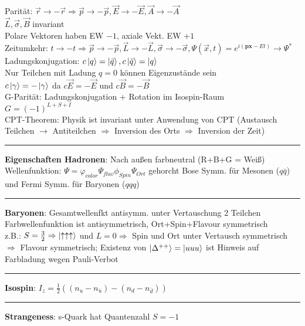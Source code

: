\documentclass[10pt,twoside,a4paper]{article}
\begin{document}
\begin{multicols*}{3}
Parität: $\vec{r} \to - \vec{r} \Rightarrow \vec{p} \to - \vec{p}, \vec{E} \to - \vec{E}, \vec{A} \to - \vec{A}$ \\ $\vec{L}, \vec{\sigma}, \vec{B}$ invariant \\
Polare Vektoren haben EW $-1$, axiale Vekt. EW $+1$ \\
Zeitumkehr: $t \to -t \Rightarrow \vec{p} \to -\vec{p}, \vec{L} \to - \vec{L}, \vec{\sigma} \to - \vec{\sigma}, \Psi (\vec{x},t) = e^{i(\textbf{px} - E t)} \to \Psi^*$ \\
Ladungskonjugation: $c \ket{q} = \ket{\bar{q}}, c \ket{\bar{q}} = \ket{q}$ \\
Nur Teilchen mit Ladung $q = 0$ können Eigenzustände sein \\
$c \ket{\gamma} = - \ket{\gamma}$ da $c \vec{E} = - \vec{E}$ und $c \vec{B} = - \vec{B}$ \\
G-Parität: Ladungskonjugation + Rotation im Isospin-Raum \\
$G = (-1)^{L+S+I}$ \\
CPT-Theorem: Physik ist invariant unter Anwendung von CPT (Austausch Teilchen $\to$ Antiteilchen $\Rightarrow$ Inversion des Orts $\Rightarrow$ Inversion der Zeit)
\\ \rule[0ex]{\columnwidth}{0.5pt}
\textbf{Eigenschaften Hadronen}: Nach außen farbneutral (R+B+G = Weiß) \\
Wellenfunktion: $\Psi = \varphi_{color} \Psi_{flav} \phi_{Spin} \Psi_{Ort}$ gehorcht Bose Symm. für Mesonen ($q\bar{q}$) und Fermi Symm. für Baryonen ($qqq$)
\\ \rule[0ex]{\columnwidth}{0.5pt}
\textbf{Baryonen}: Gesamtwellenfkt antisymm. unter Vertauschung 2 Teilchen \\
Farbwellenfunktion ist antisymmetrisch, Ort+Spin+Flavour symmetrisch \\
z.B.: $S = \frac{3}{2} \Rightarrow \ket{\uparrow \uparrow \uparrow}$ und $L = 0 \Rightarrow$ Spin und Ort unter Vertausch symmetrisch $\Rightarrow$ Flavour symmetrisch; Existenz von $\ket{\Delta^{++}} = \ket{uuu}$ ist Hinweis auf Farbladung wegen Pauli-Verbot
\\ \rule[0ex]{\columnwidth}{0.5pt}
\textbf{Isospin}: $I_z = \frac{1}{2} \left( (n_u - n_{\bar{u}}) - (n_d - n_{\bar{d}}) \right)$
\\ \rule[0ex]{\columnwidth}{0.5pt}
\textbf{Strangeness}: s-Quark hat Quantenzahl $S = -1$ \\

\end{multicols*}
\end{document}
